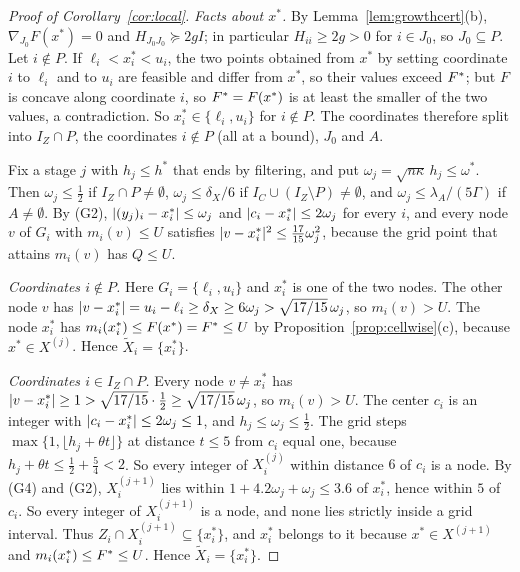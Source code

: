 \begin{proof}[Proof of Corollary~\ref{cor:local}]
\emph{Facts about $x^*$.} By Lemma~\ref{lem:growthcert}(b),
$\nabla_{J_0}F(x^*)=0$ and $H_{J_0J_0}\succeq2gI$; in particular
$H_{ii}\ge2g>0$ for $i\in J_0$, so $J_0\subseteq P$. Let $i\notin P$. If
$\ell_i<x^*_i<u_i$, the two points obtained from $x^*$ by setting coordinate
$i$ to $\ell_i$ and to $u_i$ are feasible and differ from $x^*$, so their
values exceed $F^{*}$; but $F$ is
concave along coordinate $i$, so $F^{*}=F(x^*)$ is at least the smaller of the
two values, a contradiction. So $x^*_i\in\{\ell_i,u_i\}$ for $i\notin P$. The
coordinates therefore split into $I_Z\cap P$, the coordinates $i\notin P$
(all at a bound), $J_0$ and $A$.

Fix a stage $j$ with $h_j\le h^*$ that ends by filtering, and put
$\omega_j=\sqrt{n\kappa}\,h_j\le\omega^*$. Then $\omega_j\le\frac12$ if
$I_Z\cap P\ne\emptyset$,
$\omega_j\le\delta_X/6$ if $I_C\cup(I_Z\setminus P)\ne\emptyset$, and
$\omega_j\le\lambda_A/(5\Gamma)$ if $A\ne\emptyset$. By (G2),
$\lvert (y_j)_i-x^*_i\rvert\le\omega_j$ and $\lvert c_i-x^*_i\rvert\le2\omega_j$ for every $i$, and
every node $v$ of $G_i$ with $m_i(v)\le U$ satisfies
$\lvert v-x^*_i\rvert^2\le\frac{17}{15}\omega_j^2$, because the grid point that attains
$m_i(v)$ has $Q\le U$.

\emph{Coordinates $i\notin P$.} Here $G_i=\{\ell_i,u_i\}$ and $x^*_i$ is one
of the two nodes. The other node $v$ has
$\lvert v-x^*_i\rvert=u_i-\ell_i\ge\delta_X\ge6\omega_j>\sqrt{17/15}\,\omega_j$, so
$m_i(v)>U$. The node $x^*_i$ has $m_i(x^*_i)\le F(x^*)=F^{*}\le U$ by
Proposition~\ref{prop:cellwise}(c), because $x^*\in X^{(j)}$. Hence
$\tilde X_i=\{x^*_i\}$.

\emph{Coordinates $i\in I_Z\cap P$.} Every node $v\ne x^*_i$ has
$\lvert v-x^*_i\rvert\ge1>\sqrt{17/15}\cdot\frac12\ge\sqrt{17/15}\,\omega_j$, so
$m_i(v)>U$. The center $c_i$ is an integer with $\lvert c_i-x^*_i\rvert\le2\omega_j\le1$,
and $h_j\le\omega_j\le\frac12$. The grid steps
$\max\{1,\lfloor h_j+\theta t\rfloor\}$ at distance $t\le5$ from $c_i$ equal
one, because $h_j+\theta t\le\frac12+\frac54<2$. So every integer of
$X^{(j)}_i$ within distance $6$ of $c_i$ is a node. By (G4) and (G2),
$X^{(j+1)}_i$ lies within $1+4.2\omega_j+\omega_j\le3.6$ of $x^*_i$, hence within
$5$ of $c_i$. So every integer of $X^{(j+1)}_i$ is a node, and none lies
strictly inside a grid interval. Thus
$Z_i\cap X^{(j+1)}_i\subseteq\{x^*_i\}$, and $x^*_i$ belongs to it because
$x^*\in X^{(j+1)}$ and $m_i(x^*_i)\le F^{*}\le U$. Hence $\tilde X_i=\{x^*_i\}$.


\end{proof}
